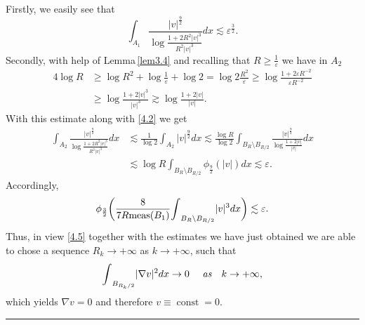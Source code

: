 \documentclass[12pt]{article}
\numberwithin{equation}{section}
\theoremstyle{definition}
\begin{document}
Firstly, we easily see that 
\[
\int_{A_1} \frac{| {v} |^{ \frac92}}{\log \frac{1+ 2R^2 | {v} |^3}{R^2 | {v} |^3}}  dx \lesssim  {\varepsilon} ^{ \frac32}.
\]
Secondly, with help of Lemma\,\ref{lem3.4} and recalling that $ R \ge \frac{1}{\varepsilon}$ we have in  $ A_2$
\begin{align*}
4 \log R &\ge  \log R^2 + \log \frac{1}{\varepsilon} + \log 2 
= \log 2 \frac{R^2}{\varepsilon} \ge \log \frac{1 + 2 {\varepsilon} R^{ -2}}{{\varepsilon} R^{ -2}} 
\\
&\ge \log\frac{1+ 2| {v} |^3}{| {v} |^3} \gtrsim \log\frac{1+ 2| {v} |}{| {v} |}.
\end{align*}
With this estimate along with \eqref{4.2} we get
\begin{align*}
\int_{A_2} \frac{| {v} |^{ \frac92}}{\log \frac{1+ 2R^2 | {v} |^3}{R^2 | {v} |^3}} dx &\lesssim  \frac{1}{\log 2}{\int\limits}_{A_2} | {v} |^{ \frac92} dx \lesssim    \frac{\log R}{\log 2} \int_{B_{ R}  \setminus B_{ R/2}} \frac{| {v} |^{ \frac92}}{\log \frac{1+2| {v} |}{| {v} |}} dx
\\
& \lesssim   \log R \int_{B_{ R}  \setminus B_{ R/2}} \phi _{ \frac92} (| {v} |)  dx \lesssim {\varepsilon}. 
\end{align*}
Accordingly,
\[
 \phi_{ \frac32} \bigg(\frac{8}{7R {\operatorname{\rm meas}} (B_1)} {\int\limits}_{B_{ R}  \setminus B_{ R/2}}  | {v} |^3 dx\bigg)  \lesssim  {\varepsilon}.  
\]
Thus, in view \eqref{4.5} together with the estimates we have just obtained we are able to chose a sequence $ R_k \rightarrow +\infty$ as $ k \rightarrow +\infty$, such that 
\[
{\int\limits}_{B_{ R_k/2}} | \nabla {v} |^2 dx \rightarrow 0\quad  \text{ {\it as}}\quad  k \rightarrow +\infty,
\]
which yields $ \nabla {v} ={ 0}$ and therefore $ {v} \equiv {\operatorname*{const}}={0}$.   \hfill {\rule{0.2cm}{0.2cm}} 
\end{document}
